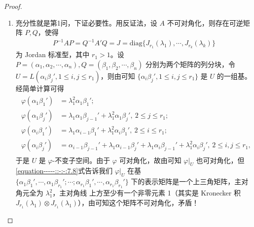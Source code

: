 \documentclass[../../main.tex]{subfiles}
\begin{document}
\begin{proof}
\begin{enumerate}
\item 充分性就是第1问，下证必要性。用反证法，设 $A$ 不可对角化，则存在可逆矩阵 $P,Q$，使得
\begin{align*}
P^{-1}AP = Q^{-1}A'Q = J = \mathrm{diag}\{J_{r_1}(\lambda_1),\cdots,J_{r_k}(\lambda_k)\}
\end{align*}
为 Jordan 标准型，其中 $r_1 > 1$。设 $P = (\alpha_1,\alpha_2,\cdots,\alpha_n),Q = (\beta_1,\beta_2,\cdots,\beta_n)$ 分别为两个矩阵的列分块，令 $U = L(\alpha_i\beta_j',1\leqslant  i,j\leqslant  r_1)$，则由可知 $\{\alpha_i\beta_j',1\leqslant  i,j\leqslant  r_1\}$ 是 $U$ 的一组基。经简单计算可得
\begin{gather}\label{equation-----::-:-:7.8}
\begin{aligned}
\varphi(\alpha_1\beta_1')&=\lambda_1^2\alpha_1\beta_1';\\
\varphi(\alpha_1\beta_j')&=\lambda_1\alpha_1\beta_{j - 1}' + \lambda_1^2\alpha_1\beta_j',\ 2\leqslant  j\leqslant  r_1;\\
\varphi(\alpha_i\beta_1')&=\lambda_1\alpha_{i - 1}\beta_1' + \lambda_1^2\alpha_i\beta_1',\ 2\leqslant  i\leqslant  r_1;\\
\varphi(\alpha_i\beta_j')&=\alpha_{i - 1}\beta_{j - 1}' + \lambda_1\alpha_{i - 1}\beta_j' + \lambda_1\alpha_i\beta_{j - 1}' + \lambda_1^2\alpha_i\beta_j',\ 2\leqslant  i,j\leqslant  r_1,
\end{aligned}
\end{gather}
于是 $U$ 是 $\varphi$-不变子空间。由于 $\varphi$ 可对角化，故由可知 $\varphi|_U$ 也可对角化，但\eqref{equation-----::-:-:7.8}式告诉我们 $\varphi|_U$ 在基 $\{\alpha_1\beta_1',\cdots,\alpha_1\beta_{r_1}';\cdots;\alpha_{r_1}\beta_1',\cdots,\alpha_{r_1}\beta_{r_1}'\}$ 下的表示矩阵是一个上三角矩阵，主对角元全为 $\lambda_1^2$，主对角线 上方至少有一个非零元素 1（其实是 Kronecker 积 $J_{r_1}(\lambda_1)\otimes J_{r_1}(\lambda_1)$），由可知这个矩阵不可对角化，矛盾！
\end{enumerate}
\end{proof}
\end{document}
